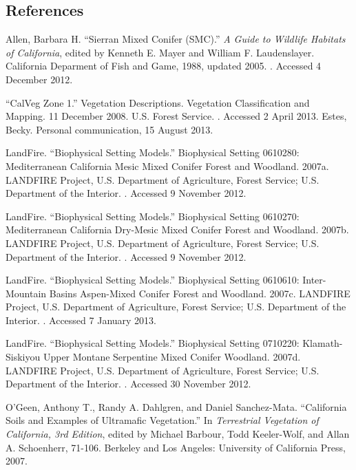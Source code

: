 \subsection*{References}
\begin{hangparas}{.25in}{1} 
Allen, Barbara H. ``Sierran Mixed Conifer (SMC).'' \emph{A Guide to Wildlife Habitats of California}, edited by Kenneth E. Mayer and William F. Laudenslayer. California Deparment of Fish and Game, 1988, updated 2005. . Accessed 4 December 2012.

``CalVeg Zone 1.'' Vegetation Descriptions. Vegetation Classification and Mapping.  11 December 2008. U.S. Forest Service. . Accessed 2 April 2013.
Estes, Becky. Personal communication, 15 August 2013.

LandFire. ``Biophysical Setting Models.'' Biophysical Setting 0610280: Mediterranean California Mesic Mixed Conifer Forest and Woodland. 2007a. LANDFIRE Project, U.S. Department of Agriculture, Forest Service; U.S. Department of the Interior. . Accessed 9 November 2012.

LandFire. ``Biophysical Setting Models.'' Biophysical Setting 0610270: Mediterranean California Dry-Mesic Mixed Conifer Forest and Woodland. 2007b. LANDFIRE Project, U.S. Department of Agriculture, Forest Service; U.S. Department of the Interior. . Accessed 9 November 2012.

LandFire. ``Biophysical Setting Models.'' Biophysical Setting 0610610: Inter-Mountain Basins Aspen-Mixed Conifer Forest and Woodland. 2007c. LANDFIRE Project, U.S. Department of Agriculture, Forest Service; U.S. Department of the Interior. . Accessed 7 January 2013.

LandFire. ``Biophysical Setting Models.'' Biophysical Setting 0710220: Klamath-Siskiyou Upper Montane Serpentine Mixed Conifer Woodland. 2007d. LANDFIRE Project, U.S. Department of Agriculture, Forest Service; U.S. Department of the Interior. . Accessed 30 November 2012.

O'Geen, Anthony T., Randy A. Dahlgren, and Daniel Sanchez-Mata. ``California Soils and Examples of Ultramafic Vegetation.'' In \emph{Terrestrial Vegetation of California, 3rd Edition}, edited by Michael Barbour, Todd Keeler-Wolf, and Allan A. Schoenherr, 71-106. Berkeley and Los Angeles: University of California Press, 2007. 


\end{hangparas}
